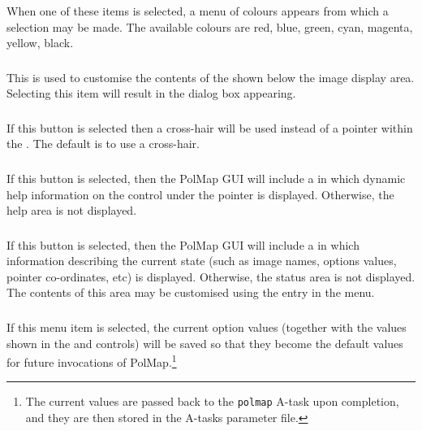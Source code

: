 When one of these items is selected, a menu of colours appears from which
a selection may be made. The available colours are red, blue, green,
cyan, magenta, yellow, black.

\subsubsection {} This is used to
customise the contents of the 
shown below the image display area. Selecting this item will result in the 
 dialog
box appearing.

\subsubsection {}
If this button is selected then a cross-hair will be used instead of a
pointer within the .
The default is to use a cross-hair.

\subsubsection {} 
If this button is selected, then the PolMap GUI will include a
 in which dynamic help information
on the control under the pointer is displayed. Otherwise, the help area
is not displayed.

\subsubsection {} 
If this button is selected, then the PolMap GUI will include a
 in which information
describing the current state (such as image names, options values, 
pointer co-ordinates, etc) is displayed. Otherwise, the
status area is not displayed. The contents of this area may be customised
using the  entry in the
 menu.

\subsubsection {} 
If this menu item is selected, the current option values (together with
the values shown in the 
and  controls) will be saved so that
they become the default values for future invocations of
PolMap.\footnote{The current values are passed back to the {\tt polmap} A-task 
upon completion, and they are then stored in the A-tasks parameter file.}

